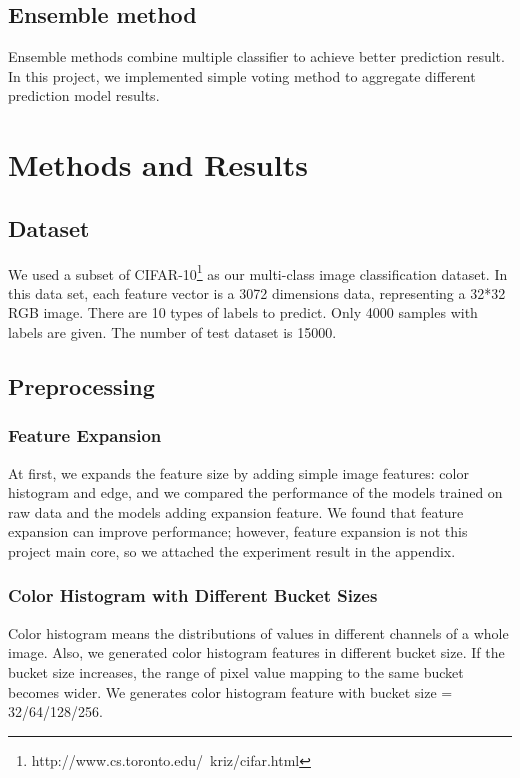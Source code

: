\documentclass{acm_proc_article-sp}
\begin{document}
\subsection{Ensemble method}
Ensemble methods combine multiple classifier to achieve better prediction result. In this project, we implemented simple voting method to aggregate different prediction model results. 


\section{Methods and Results}

\subsection{Dataset}
We used a subset of CIFAR-10\footnote{http://www.cs.toronto.edu/~kriz/cifar.html} as our multi-class image classification dataset. In this data set, each feature vector is a 3072 dimensions data, representing a 32*32 RGB image. There are 10 types of labels to predict. Only 4000 samples with labels are given. The number of test dataset is 15000. 

\subsection{Preprocessing}

\subsubsection{Feature Expansion}
At first, we expands the feature size by adding simple image features: color histogram and edge, and we compared the performance of the models trained on raw data and the models adding expansion feature. We found that feature expansion can improve performance; however, feature expansion is not this project main core, so we attached the experiment result in the appendix.

\subsubsection{Color Histogram with Different Bucket Sizes}

Color histogram means the distributions of values in different channels of a whole image. Also, we generated color histogram features in different bucket size. If the bucket size increases, the range of pixel value mapping to the same bucket becomes wider. We generates color histogram feature with bucket size = 32/64/128/256.
\end{document}
